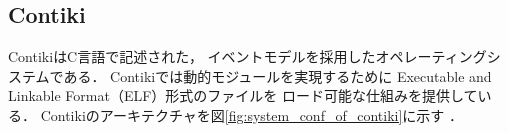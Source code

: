 



\subsection{Contiki}
Contiki\cite{Dunkels:2004:CLF:1032658.1034117}はC言語で記述された，
イベントモデルを採用したオペレーティングシステムである．
Contikiでは動的モジュールを実現するために
Executable and Linkable Format（ELF）形式のファイルを
ロード可能な仕組みを提供している\cite{Dunkels06run-timedynamic}．
Contikiのアーキテクチャを図\ref{fig:system_conf_of_contiki}に示す
\cite{Dwivedi_operatingsystems}．




